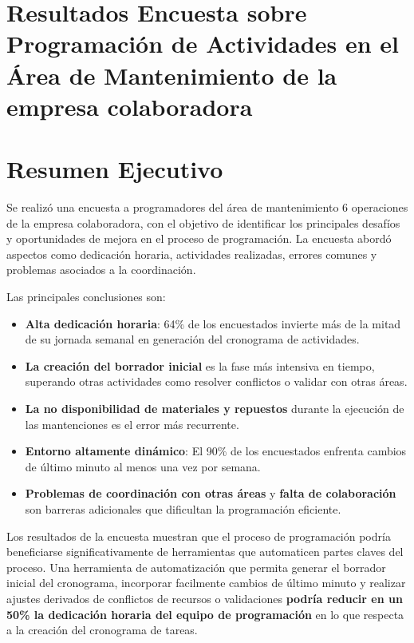 \documentclass{article}
\begin{document}
\begin{appendix}
    \section{Resultados Encuesta sobre Programación de Actividades en el Área de Mantenimiento de la empresa colaboradora}
    \label{anexo:encuesta}

    \section*{Resumen Ejecutivo}

    Se realizó una encuesta a programadores del área de mantenimiento 6 operaciones de la empresa colaboradora, con el objetivo de identificar los principales desafíos y oportunidades de mejora en el proceso de programación. La encuesta abordó aspectos como dedicación horaria, actividades realizadas, errores comunes y problemas asociados a la coordinación.
    
    Las principales conclusiones son:
    
    \begin{itemize}
        \item \textbf{Alta dedicación horaria}: 64\% de los encuestados invierte más de la mitad de su jornada semanal en generación del cronograma de actividades.
        \item \textbf{La creación del borrador inicial} es la fase más intensiva en tiempo, superando otras actividades como resolver conflictos o validar con otras áreas.
        \item \textbf{La no disponibilidad de materiales y repuestos} durante la ejecución de las mantenciones es el error más recurrente.
        \item \textbf{Entorno altamente dinámico}: El 90\% de los encuestados enfrenta cambios de último minuto al menos una vez por semana.
        \item \textbf{Problemas de coordinación con otras áreas} y \textbf{falta de colaboración} son barreras adicionales que dificultan la programación eficiente.
    \end{itemize}
    
    Los resultados de la encuesta muestran que el proceso de programación podría beneficiarse significativamente de herramientas que automaticen partes claves del proceso. Una herramienta de automatización que permita generar el borrador inicial del cronograma, incorporar facilmente cambios de último minuto y realizar ajustes derivados de conflictos de recursos o validaciones \textbf{podría reducir en un 50\% la dedicación horaria del equipo de programación} en lo que respecta a la creación del cronograma de tareas. 
    

\end{appendix}
\end{document}
